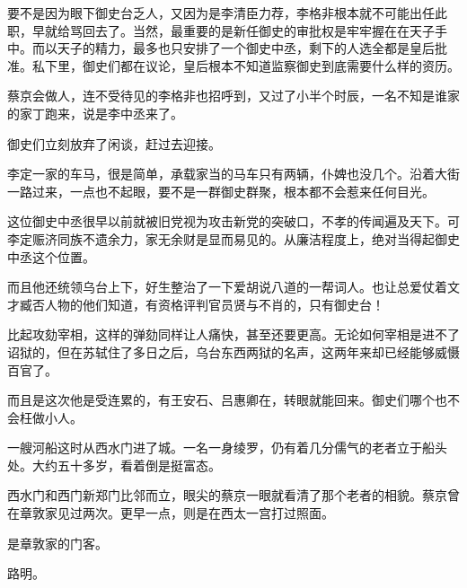 要不是因为眼下御史台乏人，又因为是李清臣力荐，李格非根本就不可能出任此职，早就给骂回去了。当然，最重要的是新任御史的审批权是牢牢握在在天子手中。而以天子的精力，最多也只安排了一个御史中丞，剩下的人选全都是皇后批准。私下里，御史们都在议论，皇后根本不知道监察御史到底需要什么样的资历。

蔡京会做人，连不受待见的李格非也招呼到，又过了小半个时辰，一名不知是谁家的家丁跑来，说是李中丞来了。

御史们立刻放弃了闲谈，赶过去迎接。

李定一家的车马，很是简单，承载家当的马车只有两辆，仆婢也没几个。沿着大街一路过来，一点也不起眼，要不是一群御史群聚，根本都不会惹来任何目光。

这位御史中丞很早以前就被旧党视为攻击新党的突破口，不孝的传闻遍及天下。可李定赈济同族不遗余力，家无余财是显而易见的。从廉洁程度上，绝对当得起御史中丞这个位置。

而且他还统领乌台上下，好生整治了一下爱胡说八道的一帮词人。也让总爱仗着文才臧否人物的他们知道，有资格评判官员贤与不肖的，只有御史台！

比起攻劾宰相，这样的弹劾同样让人痛快，甚至还要更高。无论如何宰相是进不了诏狱的，但在苏轼住了多日之后，乌台东西两狱的名声，这两年来却已经能够威慑百官了。

而且是这次他是受连累的，有王安石、吕惠卿在，转眼就能回来。御史们哪个也不会枉做小人。

一艘河船这时从西水门进了城。一名一身绫罗，仍有着几分儒气的老者立于船头处。大约五十多岁，看着倒是挺富态。

西水门和西门新郑门比邻而立，眼尖的蔡京一眼就看清了那个老者的相貌。蔡京曾在章敦家见过两次。更早一点，则是在西太一宫打过照面。

是章敦家的门客。

路明。

